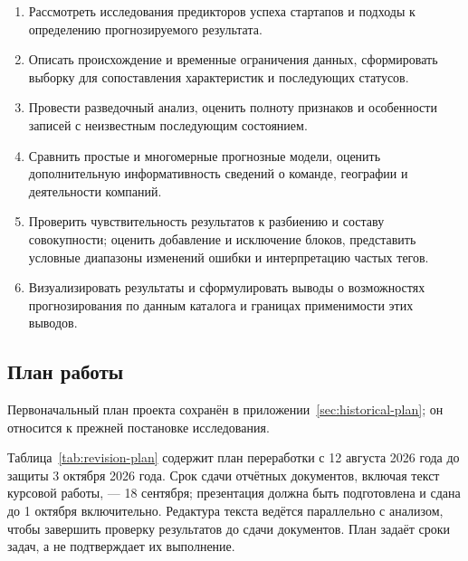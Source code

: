 \begin{enumerate}
    \item Рассмотреть исследования предикторов успеха стартапов и подходы к определению прогнозируемого результата.
    \item Описать происхождение и временные ограничения данных, сформировать выборку для сопоставления характеристик и последующих статусов.
    \item Провести разведочный анализ, оценить полноту признаков и особенности записей с неизвестным последующим состоянием.
    \item Сравнить простые и многомерные прогнозные модели, оценить дополнительную информативность сведений о команде, географии и деятельности компаний.
    \item Проверить чувствительность результатов к разбиению и составу совокупности; оценить добавление и исключение блоков, представить условные диапазоны изменений ошибки и интерпретацию частых тегов.
    \item Визуализировать результаты и сформулировать выводы о возможностях прогнозирования по данным каталога и границах применимости этих выводов.
\end{enumerate}

\subsection{План работы}

Первоначальный план проекта сохранён в приложении~\ref{sec:historical-plan}; он относится к прежней постановке исследования.

Таблица~\ref{tab:revision-plan} содержит план переработки с 12 августа 2026 года до защиты 3 октября 2026 года. Срок сдачи отчётных документов, включая текст курсовой работы, --- 18 сентября; презентация должна быть подготовлена и сдана до 1 октября включительно. Редактура текста ведётся параллельно с анализом, чтобы завершить проверку результатов до сдачи документов. План задаёт сроки задач, а не подтверждает их выполнение.

